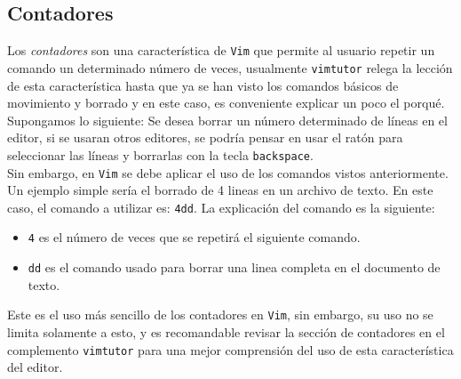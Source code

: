 \documentclass[10pt]{article}
\begin{document}
\subsection{Contadores}
Los \textit{contadores} son una característica de \texttt{Vim} que permite al usuario repetir un comando un determinado número de veces, usualmente \texttt{vimtutor} relega la lección de esta característica hasta que ya se han visto los comandos básicos de movimiento y borrado y en este caso, es conveniente explicar un poco el porqué. Supongamos lo siguiente: Se desea borrar un número determinado de líneas en el editor, si se usaran otros editores, se podría pensar en usar el ratón para seleccionar las líneas y borrarlas con la tecla \texttt{backspace}.\\
Sin embargo, en \texttt{Vim} se debe aplicar el uso de los comandos vistos anteriormente. Un ejemplo simple sería el borrado de 4 lineas en un archivo de texto. En este caso, el comando a utilizar es: \texttt{4dd}. La explicación del comando es la siguiente: 
\begin{itemize}
	\item \texttt{4} es el número de veces que se repetirá el siguiente comando. 
	\item \texttt{dd} es el comando usado para borrar una linea completa en el documento de texto. 
\end{itemize}
Este es el uso más sencillo de los contadores en \texttt{Vim}, sin embargo, su uso no se limita solamente a esto, y es recomandable revisar la sección de contadores en el complemento \texttt{vimtutor} para una mejor comprensión del uso de esta característica del editor.
\end{document}
